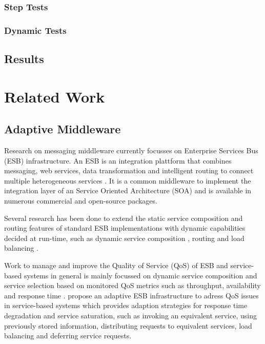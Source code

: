 \subsubsection{Step Tests}
\label{sec:ch05_step_tests}

\subsubsection{Dynamic Tests}

\subsection{Results}

\section{Related Work}\label{sec:ch5_related_work}
\subsection{Adaptive Middleware}
Research on messaging middleware currently focusses on Enterprise Services Bus (ESB) infrastructure. An ESB is an integration plattform that combines messaging, web services, data transformation and intelligent routing to connect multiple heterogeneous services \citep{Chappell:2004jo}. It is a common middleware to implement the integration layer of an Service Oriented Architecture (SOA) and is available in numerous commercial and open-source packages.

Several research has been done to extend the static service composition and routing features of standard ESB implementations with dynamic capabilities decided at run-time, such as dynamic service composition \citep{Chang:2007aa}, routing \citep{Bai:2007aa} \citep{Wu:2008aa} \citep{Ziyaeva:2008aa} and load balancing \citep{Jongtaveesataporn:2010aa}.

Work to manage and improve the Quality of Service (QoS) of ESB and service-based systems in general is mainly focussed on dynamic service composition and service selection based on monitored QoS metrics such as throughput, availability and response time \citep{Calinescu:2011aa}. \cite{Gonzalez:2011} propose an adaptive ESB infrastructure to adress QoS issues in service-based systems which provides adaption strategies for response time degradation and service saturation, such as invoking an equivalent service, using previously stored information, distributing requests to equivalent services, load balancing and deferring service requests.

